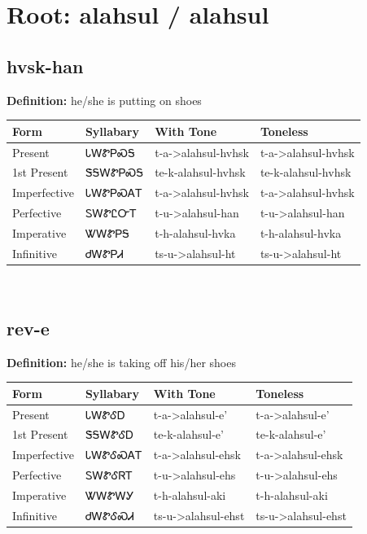 \documentclass{article}%
\begin{document}
%
\normalsize%
\section*{Root: alahsul / alahsul}%
\subsection*{hvsk-han}%
\textbf{Definition: }%
he/she is putting on shoes%
\\[0.5em]%
\begin{tabular}{|l|l|l|l|}%
\hline%
\textbf{Form}&\textbf{Syllabary}&\textbf{With Tone}&\textbf{Toneless}\\%
\hline%
Present&ᏓᎳᏑᏢᏍᎦ&t{-}a{-}>alahsul{-}hvhsk&t{-}a{-}>alahsul{-}hvhsk\\%
1st Present&ᏕᎦᎳᏑᏢᏍᎦ&te{-}k{-}alahsul{-}hvhsk&te{-}k{-}alahsul{-}hvhsk\\%
Imperfective&ᏓᎳᏑᏢᏍᎪᎢ&t{-}a{-}>alahsul{-}hvhsk&t{-}a{-}>alahsul{-}hvhsk\\%
Perfective&ᏚᎳᏑᏝᏅᎢ&t{-}u{-}>alahsul{-}han&t{-}u{-}>alahsul{-}han\\%
Imperative&ᏔᎳᏑᏢᎦ&t{-}h{-}alahsul{-}hvka&t{-}h{-}alahsul{-}hvka\\%
Infinitive&ᏧᎳᏑᏢᏗ&ts{-}u{-}>alahsul{-}ht&ts{-}u{-}>alahsul{-}ht\\%
\hline%
\end{tabular}%
\\[1em]%
\subsection*{rev-e}%
\textbf{Definition: }%
he/she is taking off his/her shoes%
\\[0.5em]%
\begin{tabular}{|l|l|l|l|}%
\hline%
\textbf{Form}&\textbf{Syllabary}&\textbf{With Tone}&\textbf{Toneless}\\%
\hline%
Present&ᏓᎳᏑᎴᎠ&t{-}a{-}>alahsul{-}e'&t{-}a{-}>alahsul{-}e'\\%
1st Present&ᏕᎦᎳᏑᎴᎠ&te{-}k{-}alahsul{-}e'&te{-}k{-}alahsul{-}e'\\%
Imperfective&ᏓᎳᏑᎴᏍᎪᎢ&t{-}a{-}>alahsul{-}ehsk&t{-}a{-}>alahsul{-}ehsk\\%
Perfective&ᏚᎳᏑᎴᏒᎢ&t{-}u{-}>alahsul{-}ehs&t{-}u{-}>alahsul{-}ehs\\%
Imperative&ᏔᎳᏑᎳᎩ&t{-}h{-}alahsul{-}aki&t{-}h{-}alahsul{-}aki\\%
Infinitive&ᏧᎳᏑᎴᏍᏗ&ts{-}u{-}>alahsul{-}ehst&ts{-}u{-}>alahsul{-}ehst\\%
\hline%
\end{tabular}%
\\[1em]%
\end{document}
